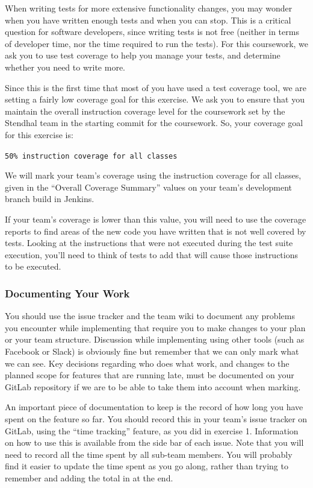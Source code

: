 \documentclass[
]{book}
\begin{document}
When writing tests for more extensive functionality changes, you may wonder when you have written enough tests and when you can stop. This is a critical question for software developers, since writing tests is not free (neither in terms of developer time, nor the time required to run the tests). For this coursework, we ask you to use test coverage to help you manage your tests, and determine whether you need to write more.

Since this is the first time that most of you have used a test coverage tool, we are setting a fairly low coverage goal for this exercise. We ask you to ensure that you maintain the overall instruction coverage level for the coursework set by the Stendhal team in the starting commit for the coursework. So, your coverage goal for this exercise is:

\texttt{50\%\ instruction\ coverage\ for\ all\ classes}

We will mark your team's coverage using the instruction coverage for all classes, given in the ``Overall Coverage Summary'' values on your team's development branch build in Jenkins.

If your team's coverage is lower than this value, you will need to use the coverage reports to find areas of the new code you have written that is not well covered by tests. Looking at the instructions that were not executed during the test suite execution, you'll need to think of tests to add that will cause those instructions to be executed.

\hypertarget{docuwork}{%
\subsubsection*{Documenting Your Work}\label{docuwork}}

You should use the issue tracker and the team wiki to document any problems you encounter while implementing that require you to make changes to your plan or your team structure. Discussion while implementing using other tools (such as Facebook or Slack) is obviously fine but remember that we can only mark what we can see. Key decisions regarding who does what work, and changes to the planned scope for features that are running late, must be documented on your GitLab repository if we are to be able to take them into account when marking.

An important piece of documentation to keep is the record of how long you have spent on the feature so far. You should record this in your team's issue tracker on GitLab, using the ``time tracking'' feature, as you did in exercise 1. Information on how to use this is available from the side bar of each issue. Note that you will need to record all the time spent by all sub-team members. You will probably find it easier to update the time spent as you go along, rather than trying to remember and adding the total in at the end.
\end{document}
